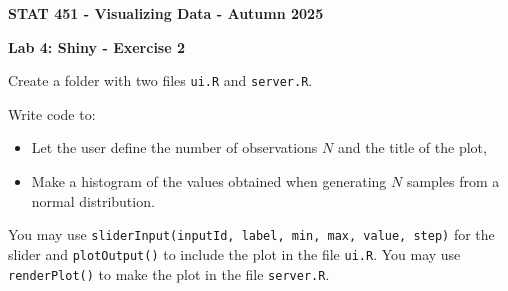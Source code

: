 \documentclass[letterpaper, 12pt]{article}
\begin{document}
\begin{center}
\textbf{\Large{STAT 451 - Visualizing Data - Autumn 2025}}
\end{center}

\vspace{2em}

\textbf{\large{Lab 4: Shiny - Exercise 2}}

\vspace{2em}

Create a folder with two files \verb|ui.R| and \verb|server.R|.

\vspace{1em}

Write code to:
\begin{itemize}
	\item Let the user define the number of observations $N$ and the title of the plot,
	\item Make a histogram of the values obtained when generating $N$ samples from a normal distribution.
\end{itemize}

\vspace{1em}

You may use \verb|sliderInput(inputId, label, min, max, value, step)| for the slider and \verb|plotOutput()| to include the plot in the file \verb|ui.R|. You may use \verb|renderPlot()| to make the plot in the file \verb|server.R|.
 
\end{document}
